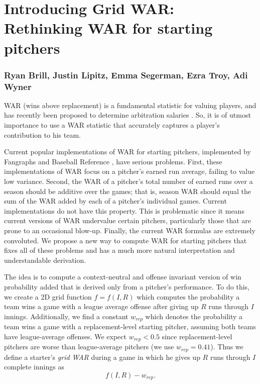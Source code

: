 \documentclass[12pt]{article}
\begin{document}
\section*{Introducing  Grid WAR: Rethinking WAR for starting pitchers}

\subsubsection*{Ryan Brill, Justin Lipitz, Emma Segerman, Ezra Troy, Adi Wyner}

WAR (wins above replacement) is a fundamental statistic for valuing players, and has recently been proposed to determine arbitration salaries \cite{war_arb}. So, it is of utmost importance to use a WAR statistic that accurately captures a player's contribution to his team. 

Current popular implementations of WAR for starting pitchers, implemented by Fangraphs \cite{war_FG} and Baseball Reference \cite{war_BR}, have serious problems. First, these implementations of WAR focus on a pitcher's earned run average, failing to value low variance.  Second,  the WAR of a pitcher's total number of earned runs over a season should  be additive over the games; that is, season WAR should equal the sum of the WAR added by each of a pitcher's individual games. Current implementations do not have this property.  This is problematic since it means current versions of WAR undervalue certain pitchers, particularly those that are prone to an occasional blow-up. Finally, the current WAR formulas are extremely convoluted. We propose a new way to compute WAR for starting pitchers that  fixes all of these problems and has a much more natural interpretation and understandable derivation.

The idea is to compute a context-neutral and offense invariant version of win probability added that is derived  only from a pitcher's performance. To do this, we create a 2D grid function $f=f(I,R)$ which computes the probability a team wins a game with a league average offense after giving up $R$ runs through $I$ innings. Additionally, we find a constant $w_{rep}$ which denotes the probability a team wins a game with a replacement-level starting pitcher, assuming both teams have league-average offenses. We expect $w_{rep} < 0.5$ since replacement-level pitchers are worse than league-average pitchers (we use $w_{rep} = 0.41$). Thus we define a starter's \textit{grid WAR} during a game in which he gives up $R$ runs through $I$ complete innings as 
$$f(I, R) - w_{rep}.$$ 
\end{document}
